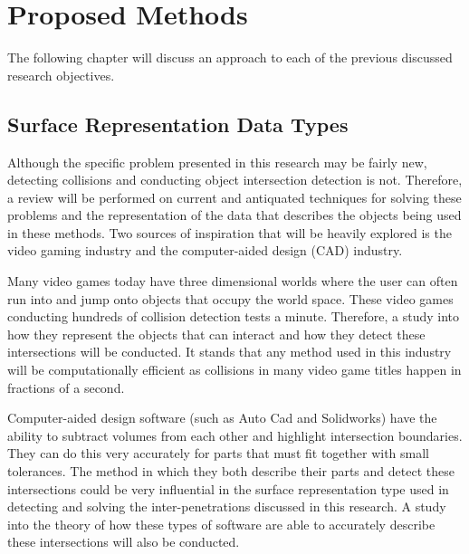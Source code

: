 %
%
%
%

\chapter{Proposed Methods}

The following chapter will discuss an approach to each of the previous discussed research objectives.
\section{Surface Representation Data Types}

Although the specific problem presented in this research may be fairly new, detecting collisions and conducting object intersection detection is not. Therefore, a review will be performed on current and antiquated techniques for solving these problems and the representation of the data that describes the objects being used in these methods. Two sources of inspiration that will be heavily explored is the video gaming industry and the computer-aided design (CAD) industry.

Many video games today have three dimensional worlds where the user can often run into and jump onto objects that occupy the world space. These video games conducting hundreds of collision detection tests a minute. Therefore, a study into how they represent the objects that can interact and how they detect these intersections will be conducted. It stands that any method used in this industry will be computationally efficient as collisions in many video game titles happen in fractions of a second.

Computer-aided design software (such as Auto Cad\textsuperscript{\textregistered} and Solidworks\textsuperscript{\textregistered}) have the ability to subtract volumes from each other and highlight intersection boundaries. They can do this very accurately for parts that must fit together with small tolerances. The method in which they both describe their parts and detect these intersections could be very influential in the surface representation type used in detecting and solving the inter-penetrations discussed in this research. A study into the theory of how these types of software are able to accurately describe these intersections will also be conducted. 

